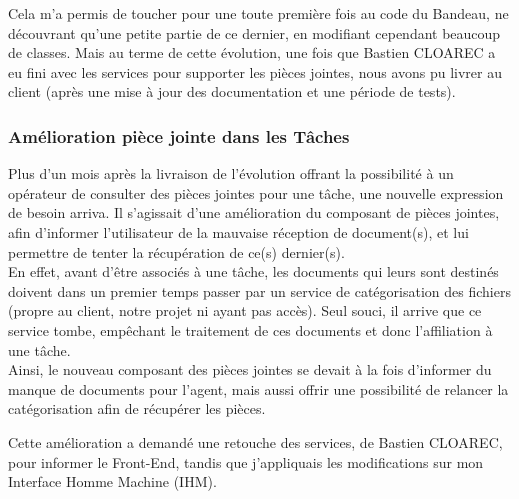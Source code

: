 \documentclass{rapport}
\begin{document}

Cela m'a permis de toucher pour une toute première fois au code du Bandeau, ne découvrant qu'une petite partie de ce dernier, en modifiant cependant beaucoup de classes. Mais au terme de cette évolution, une fois que Bastien CLOAREC a eu fini avec les services pour supporter les pièces jointes, nous avons pu livrer au client (après une mise à jour des documentation et une période de tests).\\



\subsubsection{Amélioration pièce jointe dans les Tâches}

Plus d'un mois après la livraison de l'évolution offrant la possibilité à un opérateur de consulter des pièces jointes pour une tâche, une nouvelle expression de besoin arriva. Il s'agissait d'une amélioration du composant de pièces jointes, afin d'informer l'utilisateur de la mauvaise réception de document(s), et lui permettre de tenter la récupération de ce(s) dernier(s).\\

En effet, avant d'être associés à une tâche, les documents qui leurs sont destinés doivent dans un premier temps passer par un service de catégorisation des fichiers (propre au client, notre projet ni ayant pas accès). Seul souci, il arrive que ce service tombe, empêchant le traitement de ces documents et donc l'affiliation à une tâche.\\

Ainsi, le nouveau composant des pièces jointes se devait à la fois d'informer du manque de documents pour l'agent, mais aussi offrir une possibilité de relancer la catégorisation afin de récupérer les pièces.\\


Cette amélioration a demandé une retouche des services, de Bastien CLOAREC, pour informer le Front-End, tandis que j'appliquais les modifications sur mon Interface Homme Machine (IHM).\\
\end{document}
